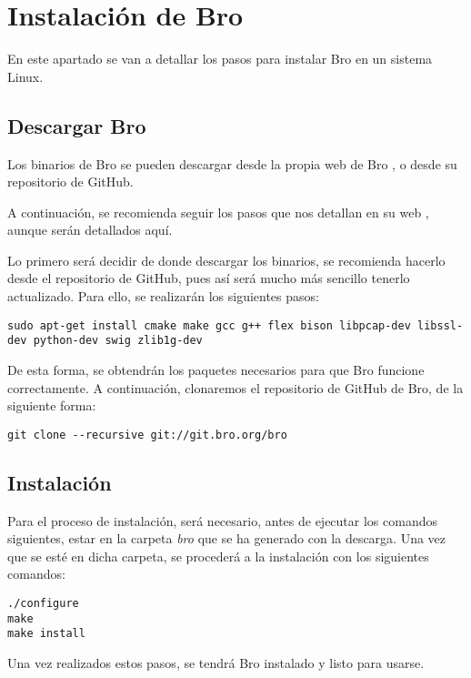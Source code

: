 \chapter{Instalación de Bro}

En este apartado se van a detallar los pasos para instalar Bro en un sistema Linux. 

\section{Descargar Bro}

Los binarios de Bro se pueden descargar desde la propia web de Bro \cite{brodownload}, o desde su repositorio de GitHub.

\intro A continuación, se recomienda seguir los pasos que nos detallan en su web \cite{broinstall}, aunque serán detallados aquí.

\intro Lo primero será decidir de donde descargar los binarios, se recomienda hacerlo desde el repositorio de GitHub, pues así será mucho más sencillo tenerlo actualizado. Para ello, se realizarán los siguientes pasos:

\begin{lstlisting}[style=Consola]
sudo apt-get install cmake make gcc g++ flex bison libpcap-dev libssl-dev python-dev swig zlib1g-dev
\end{lstlisting}

\intro De esta forma, se obtendrán los paquetes necesarios para que Bro funcione correctamente. A continuación, clonaremos el repositorio de GitHub de Bro, de la siguiente forma:

\begin{lstlisting}[style=Consola]
git clone --recursive git://git.bro.org/bro
\end{lstlisting}

\section{Instalación}

Para el proceso de instalación, será necesario, antes de ejecutar los comandos siguientes, estar en la carpeta \textit{bro} que se ha generado con la descarga. Una vez que se esté en dicha carpeta, se procederá a la instalación con los siguientes comandos:

\begin{lstlisting}[style=Consola]
./configure
make
make install
\end{lstlisting}

\intro Una vez realizados estos pasos, se tendrá Bro instalado y listo para usarse.